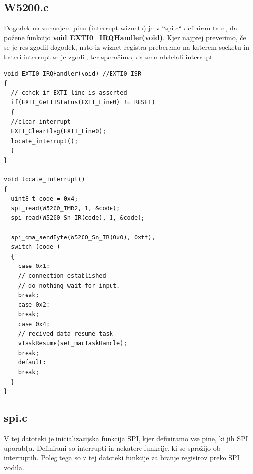 \documentclass[12pt]{article}
\begin{document}
\subsection{W5200.c}
Dogodek na zunanjem pinu (interrupt wizneta) je v “spi.c“ definiran tako, da požene funkcijo \textbf{void EXTI0\_IRQHandler(void)}. Kjer najprej preverimo, če se je res zgodil dogodek, nato iz wiznet registra preberemo na katerem socketu in kateri interrupt se je zgodil, ter sporočimo, da smo obdelali interrupt. 
\begin{lstlisting}[frame = single]
void EXTI0_IRQHandler(void) //EXTI0 ISR
{
  // cehck if EXTI line is asserted 
  if(EXTI_GetITStatus(EXTI_Line0) != RESET) 
  {  
  //clear interrupt
  EXTI_ClearFlag(EXTI_Line0); 
  locate_interrupt();
  }  
}

void locate_interrupt()
{
  uint8_t code = 0x4; 
  spi_read(W5200_IMR2, 1, &code);
  spi_read(W5200_Sn_IR(code), 1, &code);

  spi_dma_sendByte(W5200_Sn_IR(0x0), 0xff);
  switch (code )
  {  
    case 0x1: 
	// connection established 
	// do nothing wait for input. 
	break;
    case 0x2:
	break;
    case 0x4:
	// recived data resume task
	vTaskResume(set_macTaskHandle); 
	break;
    default:
	break;		
  }
}
\end{lstlisting}

\subsection{spi.c}
V tej datoteki je inicializacijska funkcija SPI, kjer definiramo vse pine, ki jih SPI uporablja. Definirani so interrupti in nekatere funkcije, ki se sprožijo ob interruptih. Poleg tega so v tej datoteki funkcije za branje registrov preko SPI vodila. 
\end{document}
